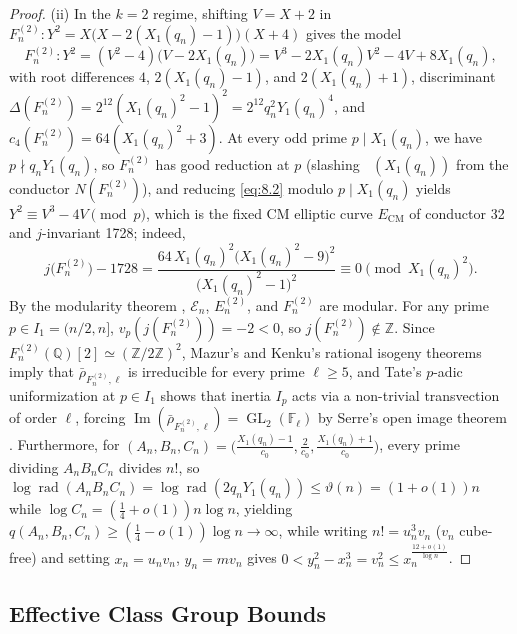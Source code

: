 \documentclass[11pt,reqno]{amsart}
\theoremstyle{remark}
\numberwithin{equation}{section}
\newcommand{\Z}{\mathbb{Z}}
\newcommand{\Q}{\mathbb{Q}}
\newcommand{\F}{\mathbb{F}}
\DeclareMathOperator{\rad}{rad}
\DeclareMathOperator{\radodd}{rad_{\mathrm{odd}}}
\DeclareMathOperator{\GL}{GL}
\DeclareMathOperator{\Imag}{Im}
\begin{document}
\begin{proof}
(ii) In the $k = 2$ regime, shifting $V = X + 2$ in $F_n^{(2)} : Y^2 = X\bigl(X - 2(X_1(q_n) - 1)\bigr)(X + 4)$ gives the model
\begin{equation}\label{eq:8.2}
F_n^{(2)} : Y^2 = (V^2 - 4)\bigl(V - 2X_1(q_n)\bigr) = V^3 - 2X_1(q_n)V^2 - 4V + 8X_1(q_n),
\end{equation}
with root differences $4$, $2(X_1(q_n) - 1)$, and $2(X_1(q_n) + 1)$, discriminant $\Delta(F_n^{(2)}) = 2^{12}(X_1(q_n)^2 - 1)^2 = 2^{12} q_n^2 Y_1(q_n)^4$, and $c_4(F_n^{(2)}) = 64(X_1(q_n)^2 + 3)$. At every odd prime $p \mid X_1(q_n)$, we have $p \nmid q_n Y_1(q_n)$, so $F_n^{(2)}$ has good reduction at $p$ (slashing $\radodd(X_1(q_n))$ from the conductor $N(F_n^{(2)})$), and reducing \eqref{eq:8.2} modulo $p \mid X_1(q_n)$ yields $Y^2 \equiv V^3 - 4V \pmod p$, which is the fixed CM elliptic curve $E_{\mathrm{CM}}$ of conductor 32 and $j$-invariant 1728; indeed,
\begin{equation}\label{eq:8.3}
j\bigl(F_n^{(2)}\bigr) - 1728 = \frac{64\,X_1(q_n)^2\bigl(X_1(q_n)^2 - 9\bigr)^2}{\bigl(X_1(q_n)^2 - 1\bigr)^2} \equiv 0 \pmod{X_1(q_n)^2}.
\end{equation}
By the modularity theorem \cite{Wiles1995,BreuilConradDiamondTaylor2001}, $\mathcal{E}_n$, $E_n^{(2)}$, and $F_n^{(2)}$ are modular. For any prime $p \in I_1 = (n/2, n]$, $v_p(j(F_n^{(2)})) = -2 < 0$, so $j(F_n^{(2)}) \notin \Z$. Since $F_n^{(2)}(\Q)[2] \simeq (\Z/2\Z)^2$, Mazur's and Kenku's rational isogeny theorems \cite{Mazur1978,Kenku1982} imply that $\bar{\rho}_{F_n^{(2)},\ell}$ is irreducible for every prime $\ell \ge 5$, and Tate's $p$-adic uniformization at $p \in I_1$ shows that inertia $I_p$ acts via a non-trivial transvection of order $\ell$, forcing $\Imag(\bar{\rho}_{F_n^{(2)},\ell}) = \GL_2(\F_\ell)$ by Serre's open image theorem \cite{Serre1972}. Furthermore, for $(A_n, B_n, C_n) = \bigl(\frac{X_1(q_n)-1}{c_0}, \frac{2}{c_0}, \frac{X_1(q_n)+1}{c_0}\bigr)$, every prime dividing $A_n B_n C_n$ divides $n!$, so $\log\rad(A_n B_n C_n) = \log\rad(2q_n Y_1(q_n)) \le \vartheta(n) = (1 + o(1))n$ while $\log C_n = (\frac{1}{4} + o(1))n\log n$, yielding $q(A_n, B_n, C_n) \ge (\frac{1}{4} - o(1))\log n \to \infty$, while writing $n! = u_n^3 v_n$ ($v_n$ cube-free) and setting $x_n = u_n v_n$, $y_n = m v_n$ gives $0 < y_n^2 - x_n^3 = v_n^2 \le x_n^{\frac{12+o(1)}{\log n}}$.
\end{proof}

\subsection{Effective Class Group Bounds}
\end{document}
